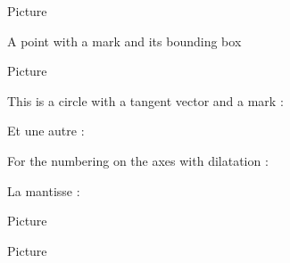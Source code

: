 


Picture 
\begin{center}
   
\end{center}


A point with a mark and its bounding box

Picture 
\Huge

\begin{center}
   
\end{center}

\normalsize



This is a circle with a tangent vector and a mark :

\begin{center}
    
\end{center}


Et une autre : 

\begin{center}
   
\end{center}


For the numbering on the axes with dilatation :


\begin{center}
   
\end{center}


\clearpage

\begin{center}

\end{center}



La mantisse :

Picture 
\begin{center}

\end{center}


\clearpage

\begin{center}

\end{center}



Picture 
\begin{center}
   
\end{center}
   


